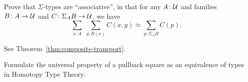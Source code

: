 \begin{exr}\label{exr:Sigma-associativity}
    Prove that\/ $\Sigma$-types are ``associative'', in that for any\/ $A\colon\univ$ and families\/ $B\colon A\to\univ$ and\/ $C\colon\Sigma_A B\to\univ$, we have
    \[
        \sum_{x\colon A}\;\sum_{y\colon B(x)}C(x,y)
        \simeq
        \sum_{p\colon\Sigma_A B}C(p).
    \]
\end{exr}

\begin{solution}
    See Theorem~\ref{thm:composite-transport}.
\end{solution}

\begin{exr}\label{exr:pullback}
    Formulate the universal property of a pullback square as an equivalence of types in Homotopy Type Theory.
\end{exr}

